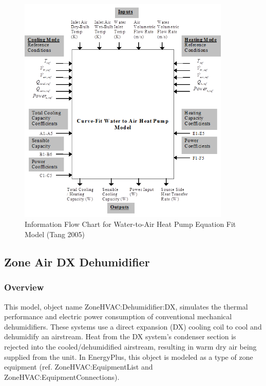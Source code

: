 \begin{figure}[hbtp] %
\centering
\includegraphics[width=0.9\textwidth, height=0.9\textheight, keepaspectratio=true]{media/image7286.png}
\caption{Information Flow Chart for Water-to-Air Heat Pump Equation Fit Model (Tang 2005) \protect \label{fig:information-flow-chart-for-water-to-air-heat-001}}
\end{figure}

\subsection{Zone Air DX Dehumidifier}\label{zone-air-dx-dehumidifier}

\subsubsection{Overview}\label{overview-9-000}

This model, object name ZoneHVAC:Dehumidifier:DX, simulates the thermal performance and electric power consumption of conventional mechanical dehumidifiers. These systems use a direct expansion (DX) cooling coil to cool and dehumidify an airstream. Heat from the DX system's condenser section is rejected into the cooled/dehumidified airstream, resulting in warm dry air being supplied from the unit. In EnergyPlus, this object is modeled as a type of zone equipment (ref. ZoneHVAC:EquipmentList and ZoneHVAC:EquipmentConnections).

